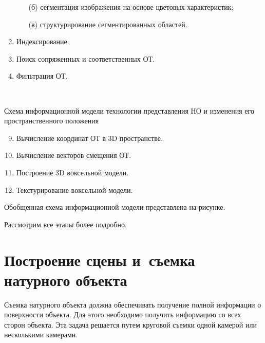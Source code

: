 \begin{multicols}{2}
\begin{enumerate}[1.]
\begin{itemize}
    \item[(б)] сегментация изображения на основе цветовых характеристик;
    \item[(в)] структурирование сегментированных областей.
    \end{itemize}
\item Индексирование.
\item Поиск сопряженных и соответственных ОТ.
\item Фильтрация ОТ.
\end{enumerate}

\vspace*{16pt}

\noindent
\begin{center}  %
 \mbox{%
 \epsfxsize=76.034mm
 }
  \end{center}

  \vspace*{6pt}

\noindent
{\small{Схема информационной модели технологии представления НО и 
изменения его пространственного положения}}


      

\addtocounter{figure}{1}

\noindent
\begin{enumerate}
\setcounter{enumi}{8}
\item Вычисление координат ОТ в 3D пространстве.
\item Вычисление векторов смещения ОТ.
\item Построение 3D воксельной модели.
\item Текстурирование воксельной модели.
\end{enumerate}

  Обобщенная схема информационной модели представлена на рисунке.
  
  Рассмотрим все этапы более подробно.
  
\section{Построение сцены и~съемка натурного объекта}

  Съемка натурного объекта должна обеспечивать получение полной 
информации о поверхности объекта. Для этого необходимо получить 
информацию cо всех сторон объекта. Эта задача решается путем круговой 
съемки одной камерой или несколькими камерами.
  

\end{multicols}
